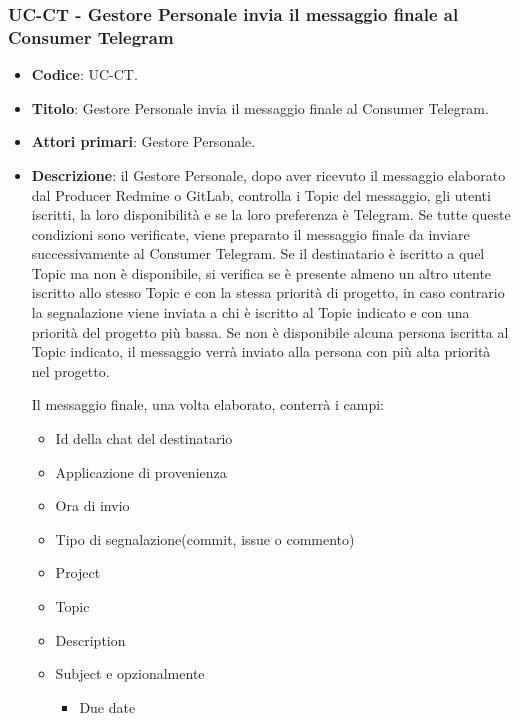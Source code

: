 \subsubsection{UC\theuccount-CT - Gestore Personale invia il messaggio finale al Consumer Telegram}
	\begin{itemize}
		\item \textbf{Codice}: UC\theuccount-CT.
		\item \textbf{Titolo}: Gestore Personale invia il messaggio finale al Consumer Telegram.
		\item \textbf{Attori primari}: Gestore Personale.
		\item \textbf{Descrizione}: il Gestore Personale, dopo aver ricevuto il messaggio elaborato
		dal Producer Redmine o GitLab, controlla i Topic del messaggio, gli utenti iscritti, la loro disponibilità e se la loro preferenza è Telegram.
		Se tutte queste condizioni sono verificate, viene preparato il messaggio finale da inviare successivamente al Consumer Telegram.
		Se il destinatario è iscritto a quel Topic ma non è disponibile, si verifica se è presente almeno un altro utente iscritto allo stesso Topic e con la stessa priorità di progetto, in caso contrario la segnalazione viene inviata a chi è iscritto al Topic indicato e con una priorità del progetto più bassa. Se non è disponibile alcuna persona iscritta al Topic indicato, il messaggio verrà inviato alla persona con più alta priorità nel progetto. \par
		Il messaggio finale, una volta elaborato, conterrà i campi:
		\begin{itemize}
			\item Id della chat del destinatario
			\item Applicazione di provenienza
			\item Ora di invio
			\item Tipo di segnalazione(commit, issue o commento)
			\item Project
			\item Topic
			\item Description
			\item Subject e opzionalmente
		 	\begin{itemize}
				\item Due date

\end{itemize}
\end{itemize}
\end{itemize}
